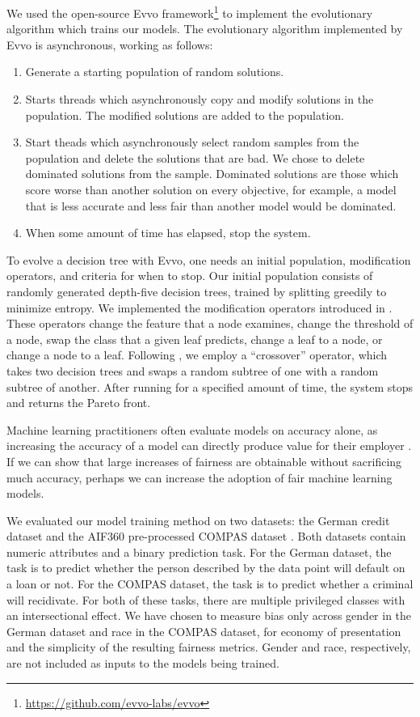 \documentclass[10pt]{acmart}
\begin{document}
We used the open-source Evvo framework\footnote{\href{https://github.com/evvo-labs/evvo}{https://github.com/evvo-labs/evvo}} to implement the evolutionary algorithm which trains our models. The evolutionary algorithm implemented by Evvo is asynchronous, working as follows:
\begin{enumerate}
	\item Generate a starting population of random solutions.
	\item Starts threads which asynchronously copy and modify solutions in the population. The modified solutions are added to the population.
	\item Start theads which asynchronously select random samples from the population and delete the solutions that are bad. We chose to delete dominated solutions from the sample. Dominated solutions are those which score worse than another solution on every objective, for example, a model that is less accurate and less fair than another model would be dominated.
	\item When some amount of time has elapsed, stop the system.
\end{enumerate}
To evolve a decision tree with Evvo, one needs an initial population, modification operators, and criteria for when to stop. Our initial population consists of randomly generated depth-five decision trees, trained by splitting greedily to minimize entropy. We implemented the modification operators introduced in \citep{Kretowski:2005}. These operators change the feature that a node examines, change the threshold of a node, swap the class that a given leaf predicts, change a leaf to a node, or change a node to a leaf. Following \citep{Papagelis:2000}, we employ a “crossover” operator, which takes two decision trees and swaps a random subtree of one with a random subtree of another. After running for a specified amount of time, the system stops and returns the Pareto front.

Machine learning practitioners often evaluate models on accuracy alone, as increasing the accuracy of a model can directly produce value for their employer \citep{Packer:2018}. If we can show that large increases of fairness are obtainable without sacrificing much accuracy, perhaps we can increase the adoption of fair machine learning models.

We evaluated our model training method on two datasets: the German credit dataset \citep{Dua:2019} and the AIF360 pre-processed COMPAS dataset \citep{Larson:2016}. Both datasets contain numeric attributes and a binary prediction task. For the German dataset, the task is to predict whether the person described by the data point will default on a loan or not. For the COMPAS dataset, the task is to predict whether a criminal will recidivate. For both of these tasks, there are multiple privileged classes with an intersectional effect. We have chosen to measure bias only across gender in the German dataset and race in the COMPAS dataset, for economy of presentation and the simplicity of the resulting fairness metrics. Gender and race, respectively, are not included as inputs to the models being trained.
\end{document}
